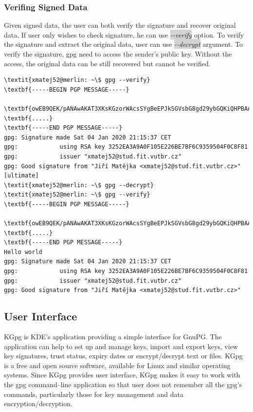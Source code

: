 \subsubsection*{Verifing Signed Data}
Given signed data, the user can both verify the signature and recover original data. If user only wishes to check signature, he can use \colorbox{lightgray}{\textit{-{}-verify}} option. To verify the signature and extract the original data, user can use \colorbox{lightgray}{\textit{-{}-decrypt}} argument. To verify the signature, gpg need to access the sender's public key. Without the access, the original data can be still recovered but cannot be verified.
\begin{Verbatim}[commandchars=\\\{\},codes={\catcode`$=3\catcode`_=8},samepage=true,frame=single]
\textit{xmatej52@merlin: ~\$ gpg --verify}
\textbf{-----BEGIN PGP MESSAGE-----}

\textbf{owEB9QEK/pANAwAKAT3XKsKGzorWAcsSYgBeEPJkSGVsbG8gd29ybGQKiQHPBAAB}
\textbf{.....}
\textbf{-----END PGP MESSAGE-----}
gpg: Signature made Sat 04 Jan 2020 21:15:37 CET
gpg:            using RSA key 3252EA3A9A0F105E226BE7BF6C9359504F0C8F81
gpg:            issuer "xmatej52@stud.fit.vutbr.cz"
gpg: Good signature from "Jiří Matějka <xmatej52@stud.fit.vutbr.cz>"
[ultimate]
\textit{xmatej52@merlin: ~\$ gpg --decrypt}
\textit{xmatej52@merlin: ~\$ gpg --verify}
\textbf{-----BEGIN PGP MESSAGE-----}

\textbf{owEB9QEK/pANAwAKAT3XKsKGzorWAcsSYgBeEPJkSGVsbG8gd29ybGQKiQHPBAAB}
\textbf{.....}
\textbf{-----END PGP MESSAGE-----}
Hello world
gpg: Signature made Sat 04 Jan 2020 21:15:37 CET
gpg:            using RSA key 3252EA3A9A0F105E226BE7BF6C9359504F0C8F81
gpg:            issuer "xmatej52@stud.fit.vutbr.cz"
gpg: Good signature from "Jiří Matějka <xmatej52@stud.fit.vutbr.cz>"
\end{Verbatim}
\subsection{User Interface}
KGpg is KDE's application providing a simple interface for GnuPG. The application can help to set up and manage keys, import and export keys, view key signatures, trust status, expiry dates or encrypt/decrypt text or files. KGpg is a free and open source software, available for Linux and similar operating systems. Since KGpg provides user interface, KGpg makes it easy to work with the gpg command--line application so that user does not remember all the gpg's commands, particularly those for key management and data encryption/decryption. \cite{KGpg}

